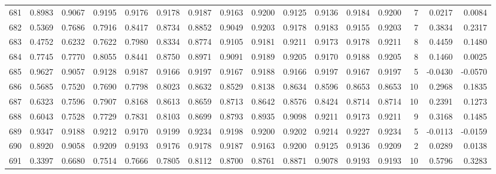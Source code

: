 \begin{tabular}{lrrrrrrrrrrrrrrr}
681 &      0.8983 &  0.9067 &  0.9195 &  0.9176 &  0.9178 &  0.9187 &  0.9163 &  0.9200 &  0.9125 &  0.9136 &   0.9184 &     0.9200 &      7 &                    0.0217 &                     0.0084 \\
682 &      0.5369 &  0.7686 &  0.7916 &  0.8417 &  0.8734 &  0.8852 &  0.9049 &  0.9203 &  0.9178 &  0.9183 &   0.9155 &     0.9203 &      7 &                    0.3834 &                     0.2317 \\
683 &      0.4752 &  0.6232 &  0.7622 &  0.7980 &  0.8334 &  0.8774 &  0.9105 &  0.9181 &  0.9211 &  0.9173 &   0.9178 &     0.9211 &      8 &                    0.4459 &                     0.1480 \\
684 &      0.7745 &  0.7770 &  0.8055 &  0.8441 &  0.8750 &  0.8971 &  0.9091 &  0.9189 &  0.9205 &  0.9170 &   0.9188 &     0.9205 &      8 &                    0.1460 &                     0.0025 \\
685 &      0.9627 &  0.9057 &  0.9128 &  0.9187 &  0.9166 &  0.9197 &  0.9167 &  0.9188 &  0.9166 &  0.9197 &   0.9167 &     0.9197 &      5 &                   -0.0430 &                    -0.0570 \\
686 &      0.5685 &  0.7520 &  0.7690 &  0.7798 &  0.8023 &  0.8632 &  0.8529 &  0.8138 &  0.8634 &  0.8596 &   0.8653 &     0.8653 &     10 &                    0.2968 &                     0.1835 \\
687 &      0.6323 &  0.7596 &  0.7907 &  0.8168 &  0.8613 &  0.8659 &  0.8713 &  0.8642 &  0.8576 &  0.8424 &   0.8714 &     0.8714 &     10 &                    0.2391 &                     0.1273 \\
688 &      0.6043 &  0.7528 &  0.7729 &  0.7831 &  0.8103 &  0.8699 &  0.8793 &  0.8935 &  0.9098 &  0.9211 &   0.9173 &     0.9211 &      9 &                    0.3168 &                     0.1485 \\
689 &      0.9347 &  0.9188 &  0.9212 &  0.9170 &  0.9199 &  0.9234 &  0.9198 &  0.9200 &  0.9202 &  0.9214 &   0.9227 &     0.9234 &      5 &                   -0.0113 &                    -0.0159 \\
690 &      0.8920 &  0.9058 &  0.9209 &  0.9193 &  0.9176 &  0.9178 &  0.9187 &  0.9163 &  0.9200 &  0.9125 &   0.9136 &     0.9209 &      2 &                    0.0289 &                     0.0138 \\
691 &      0.3397 &  0.6680 &  0.7514 &  0.7666 &  0.7805 &  0.8112 &  0.8700 &  0.8761 &  0.8871 &  0.9078 &   0.9193 &     0.9193 &     10 &                    0.5796 &                     0.3283 \\

\end{tabular}
